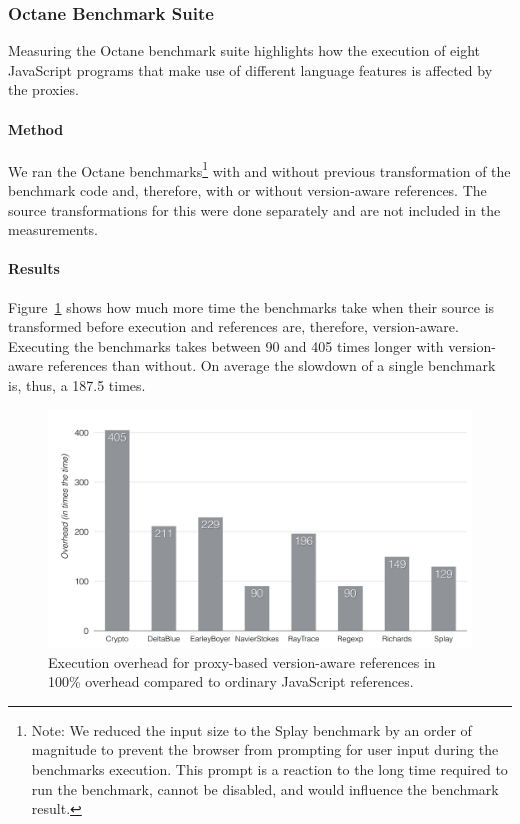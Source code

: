 \subsubsection{Octane Benchmark Suite}

Measuring the Octane benchmark suite highlights how the execution of eight JavaScript programs that make use of different language features is affected by the proxies.

\paragraph{Method}
We ran the Octane benchmarks\footnote{Note: We reduced the input size to the Splay benchmark by an order of magnitude to prevent the browser from prompting for user input during the benchmarks execution. This prompt is a reaction to the long time required to run the benchmark, cannot be disabled, and would influence the benchmark result.} with and without previous transformation of the benchmark code and, therefore, with or without version-aware references.
The source transformations for this were done separately and are not included in the measurements.

\paragraph{Results}
Figure~\ref{fig:ExecutionOverhead} shows how much more time the benchmarks take when their source is transformed before execution and references are, therefore, version-aware.
Executing the benchmarks takes between 90 and 405 times longer with version-aware references than without.
On average the slowdown of a single benchmark is, thus, a 187.5 times.

\begin{figure}[h]
    \centering
    \includegraphics[width=\textwidth]{figures/6_evaluation/3_executionOverhead.pdf}
    \caption{Execution overhead for proxy-based version-aware references in 100\% overhead compared to ordinary JavaScript references.}
    \label{fig:ExecutionOverhead}
\end{figure}


